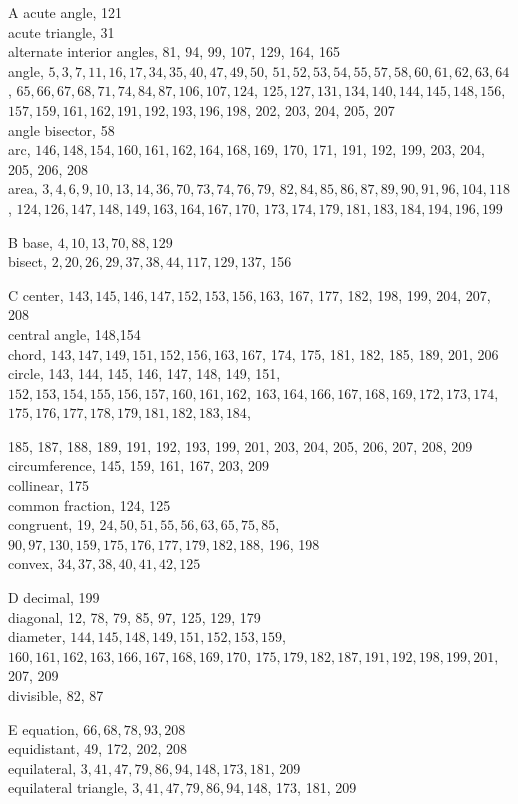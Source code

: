 \documentclass{article}
\begin{document}
A
acute angle, 121\\
acute triangle, 31\\
alternate interior angles, 81, 94, 99, 107, 129, 164, 165\\
angle, \(5,3,7,11,16,17,34,35,40,47,49,50\), \(51,52,53,54,55,57,58,60,61,62,63,64\), \(65,66,67,68,71,74,84,87,106,107,124\), \(125,127,131,134,140,144,145,148,156\), \(157,159,161,162,191,192,193,196,198\), 202, 203, 204, 205, 207\\
angle bisector, 58\\
arc, \(146,148,154,160,161,162,164,168,169\), 170, 171, 191, 192, 199, 203, 204, 205, 206, 208\\
area, \(3,4,6,9,10,13,14,36,70,73,74,76,79\), \(82,84,85,86,87,89,90,91,96,104,118\), \(124,126,147,148,149,163,164,167,170\), \(173,174,179,181,183,184,194,196,199\)

B
base, \(4,10,13,70,88,129\)\\
bisect, \(2,20,26,29,37,38,44,117,129,137\), 156

C
center, \(143,145,146,147,152,153,156,163\), 167, 177, 182, 198, 199, 204, 207, 208\\
central angle, 148,154\\
chord, \(143,147,149,151,152,156,163,167\), 174, 175, 181, 182, 185, 189, 201, 206\\
circle, 143, 144, 145, 146, 147, 148, 149, 151, \(152,153,154,155,156,157,160,161,162\), \(163,164,166,167,168,169,172,173,174\), \(175,176,177,178,179,181,182,183,184\),

185, 187, 188, 189, 191, 192, 193, 199, 201, 203, 204, 205, 206, 207, 208, 209\\
circumference, 145, 159, 161, 167, 203, 209\\
collinear, 175\\
common fraction, 124, 125\\
congruent, 19, \(24,50,51,55,56,63,65,75,85\), \(90,97,130,159,175,176,177,179,182,188\), 196, 198\\
convex, \(34,37,38,40,41,42,125\)

D
decimal, 199\\
diagonal, 12, 78, 79, 85, 97, 125, 129, 179\\
diameter, \(144,145,148,149,151,152,153,159\), \(160,161,162,163,166,167,168,169,170\), \(175,179,182,187,191,192,198,199,201\), 207, 209\\
divisible, 82, 87

E
equation, \(66,68,78,93,208\)\\
equidistant, 49, 172, 202, 208\\
equilateral, \(3,41,47,79,86,94,148,173,181\), 209\\
equilateral triangle, \(3,41,47,79,86,94,148\), 173, 181, 209
\end{document}
